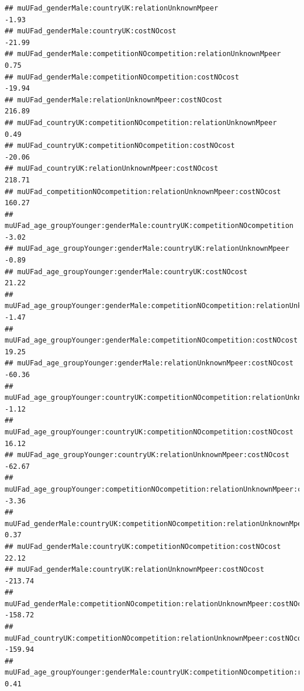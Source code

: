 \documentclass[
]{article}
\begin{document}
\begin{verbatim}
## muUFad_genderMale:countryUK:relationUnknownMpeer                                                -1.93
## muUFad_genderMale:countryUK:costNOcost                                                         -21.99
## muUFad_genderMale:competitionNOcompetition:relationUnknownMpeer                                  0.75
## muUFad_genderMale:competitionNOcompetition:costNOcost                                          -19.94
## muUFad_genderMale:relationUnknownMpeer:costNOcost                                              216.89
## muUFad_countryUK:competitionNOcompetition:relationUnknownMpeer                                   0.49
## muUFad_countryUK:competitionNOcompetition:costNOcost                                           -20.06
## muUFad_countryUK:relationUnknownMpeer:costNOcost                                               218.71
## muUFad_competitionNOcompetition:relationUnknownMpeer:costNOcost                                160.27
## muUFad_age_groupYounger:genderMale:countryUK:competitionNOcompetition                           -3.02
## muUFad_age_groupYounger:genderMale:countryUK:relationUnknownMpeer                               -0.89
## muUFad_age_groupYounger:genderMale:countryUK:costNOcost                                         21.22
## muUFad_age_groupYounger:genderMale:competitionNOcompetition:relationUnknownMpeer                -1.47
## muUFad_age_groupYounger:genderMale:competitionNOcompetition:costNOcost                          19.25
## muUFad_age_groupYounger:genderMale:relationUnknownMpeer:costNOcost                             -60.36
## muUFad_age_groupYounger:countryUK:competitionNOcompetition:relationUnknownMpeer                 -1.12
## muUFad_age_groupYounger:countryUK:competitionNOcompetition:costNOcost                           16.12
## muUFad_age_groupYounger:countryUK:relationUnknownMpeer:costNOcost                              -62.67
## muUFad_age_groupYounger:competitionNOcompetition:relationUnknownMpeer:costNOcost                -3.36
## muUFad_genderMale:countryUK:competitionNOcompetition:relationUnknownMpeer                        0.37
## muUFad_genderMale:countryUK:competitionNOcompetition:costNOcost                                 22.12
## muUFad_genderMale:countryUK:relationUnknownMpeer:costNOcost                                   -213.74
## muUFad_genderMale:competitionNOcompetition:relationUnknownMpeer:costNOcost                    -158.72
## muUFad_countryUK:competitionNOcompetition:relationUnknownMpeer:costNOcost                     -159.94
## muUFad_age_groupYounger:genderMale:countryUK:competitionNOcompetition:relationUnknownMpeer       0.41

\end{verbatim}
\end{document}
